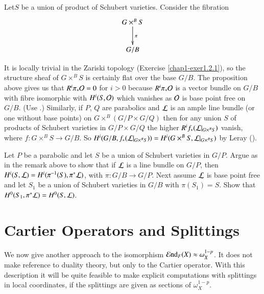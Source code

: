 \begin{remark}\label{rem-A.2.8}
Let\pageoriginale $S$\label{page82} be a union of product of Schubert varieties. Consider the
fibration
\[
\xymatrix{
G\times^{B}S\ar[d]^{\pi}\\
G/B
}
\]

It is locally trivial in the Zariski topology (Exercise
\ref{chap1-exer1.2.1}), so the structure sheaf of $G\times^{B}S$ is
certainly flat over the base $G/B$. The proposition above gives us
that $R^{i}\pi_{\ast}\mathcal{O}=0$ for $i>0$ because $R^{i}\pi_{\ast}\mathcal{O}$ is a
vector bundle on $G/B$ with fibre isomorphic with $H^{i}(S,\mathcal{O})$ which
vanishes as $\mathcal{O}$ is base point free on $G/B$. (Use \cite[Grauert's
  corollary to Semicontinuity]{key7}.) Similarly, if $P$, $Q$ are
parabolics and $\mathcal{L}$ is an ample line bundle (or one without base
points) on $G\times^{B}(G/P\times G/Q)$ then for any union $S$ of
products of Schubert varieties in $G/P\times G/Q$ the higher
$R^{i}f_{\ast}(\mathcal{L}|_{G\times^{B}S})$ vanish, where $f:G\times^{B}S\to
G/B$. So
$H^{i}(G/B,f_{\ast}(\mathcal{L}|_{G\times^{B}S}))=H^{i}(G\times^{B}S,\mathcal{L}|_{G\times^{B}S})$
by Leray (\cite[III, Ex. 8.1]{key7}).
\end{remark}

\begin{exercise}\label{exer-A.2.9}
Let $P$ be a parabolic and let $S$ be a union of Schubert varieties in
$G/P$. Argue as in the remark above to show that if $\mathcal{L}$ is a line
bundle on $G/P$, then $H^{i}(S,\mathcal{L})=H^{i}(\pi^{-1}(S),\pi^{\ast}\mathcal{L})$,
with $\pi:G/B\to G/P$. Next assume $\mathcal{L}$ is base point free and let
$S_{1}$ be a union of Schubert varieties in $G/B$ with
$\pi(S_{1})=S$. Show that $H^{0}(S_{1},\pi^{*}\mathcal{L})=H^{0}(S,\mathcal{L})$. 
\end{exercise}

\section{Cartier Operators and Splittings}\label{sec-A.3}

We now give another approach to the isomorphism $\operatorname{\mathcal{E}nd}_{F}(X)\approx
\omega^{1-p}_{X}$. It does not make reference to duality theory, but
only to the Cartier operator. With this description it will be quite
feasible to make explicit computations with splittings in local
coordinates, if the splittings are given as sections of
$\omega^{1-p}_{X}$. 

